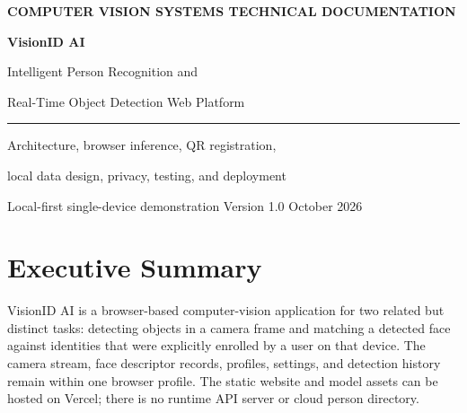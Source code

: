 \documentclass[11pt,oneside,openany]{report}
\newcommand{\product}{\textsf{VisionID AI}}
\begin{document}
\begin{titlepage}
  \pagecolor{VisionNavy}\color{white}
  \vspace*{18mm}
  {\sffamily\small\color{VisionTeal}\bfseries COMPUTER VISION SYSTEMS \hfill TECHNICAL DOCUMENTATION\par}
  \vspace{25mm}
  {\sffamily\bfseries\fontsize{34}{40}\selectfont VisionID AI\par}
  \vspace{5mm}
  {\sffamily\Large Intelligent Person Recognition and\par Real-Time Object Detection Web Platform\par}
  \vspace{8mm}
  {\color{VisionTeal}\rule{0.28\textwidth}{2pt}\par}
  \vspace{8mm}
  {\large Architecture, browser inference, QR registration,\par local data design, privacy, testing, and deployment\par}
  \vfill
  \vspace{8mm}
  {\small Local-first single-device demonstration \hfill Version 1.0  October 2026\par}
\end{titlepage}
\nopagecolor
\color{black}

\chapter*{Executive Summary}
\product{} is a browser-based computer-vision application for two related but distinct tasks: detecting objects in a camera frame and matching a detected face against identities that were explicitly enrolled by a user on that device. The camera stream, face descriptor records, profiles, settings, and detection history remain within one browser profile. The static website and model assets can be hosted on Vercel; there is no runtime API server or cloud person directory.
\end{document}
